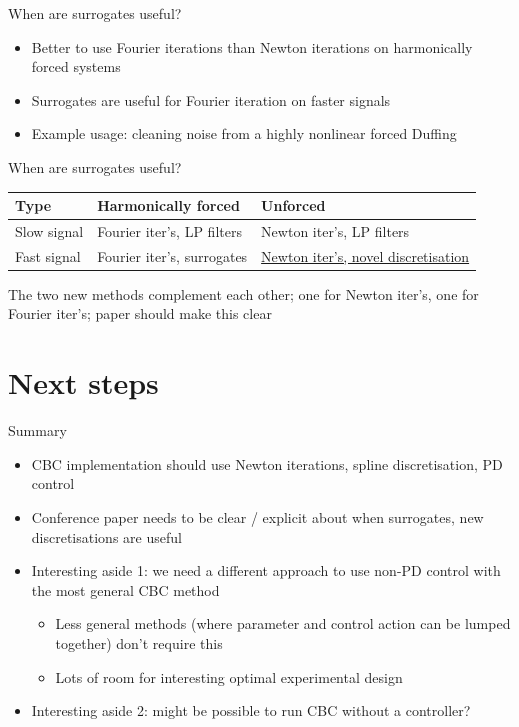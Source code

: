 \documentclass[presentation]{beamer}
\begin{document}
\begin{frame}[label={sec:org8336478}]{When are surrogates useful?}
\begin{itemize}
\item Better to use Fourier iterations than Newton iterations on harmonically forced systems
\item Surrogates are useful for Fourier iteration on faster signals
\item Example usage: cleaning noise from a highly nonlinear forced Duffing
\end{itemize}
\end{frame}

\begin{frame}[label={sec:orgdded98d}]{When are surrogates useful?}
\begin{center}
\begin{tabular}{lll}
Type & Harmonically forced & Unforced\\
\hline
Slow signal & Fourier iter's, LP filters & Newton iter's, LP filters\\
Fast signal & \alert{Fourier iter's, surrogates} & \uline{Newton iter's, novel discretisation}\\
\end{tabular}
\end{center}

\vfill
The two new methods complement each other; one for Newton iter's, one for Fourier iter's; paper should make this clear
\end{frame}

\section{Next steps}
\label{sec:orgcedb432}
\begin{frame}[<+->][label={sec:orgd56c5c2}]{Summary}
\begin{itemize}
\item CBC implementation should use Newton iterations, spline discretisation, PD control
\item Conference paper needs to be clear / explicit about when surrogates, new discretisations are useful
\item Interesting aside 1: we need a different approach to use non-PD control with the most general CBC method
\begin{itemize}
\item Less general methods (where parameter and control action can be lumped together) don't require this
\item Lots of room for interesting optimal experimental design
\end{itemize}
\item Interesting aside 2: might be possible to run CBC without a controller?
\end{itemize}
\end{frame}
\end{document}
